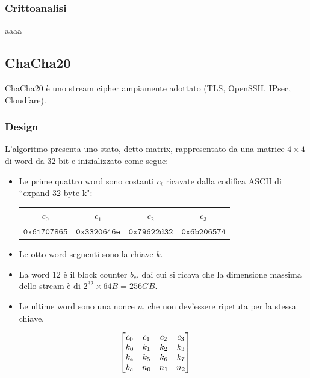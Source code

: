 \documentclass[target=bach,aauheader=,style=]{thud}
\begin{document}
			\subsubsection{Crittoanalisi}
			aaaa
		\subsection{ChaCha20\cite{chacha20}}
		ChaCha20 è uno stream cipher ampiamente adottato (TLS, OpenSSH, IPsec, Cloudfare).
			\subsubsection{Design}
			L'algoritmo presenta uno stato, detto matrix, rappresentato da una matrice $4 \times 4$ di word da 32 bit e inizializzato come segue:
			\begin{itemize}
				\item Le prime quattro word sono costanti $c_i$ ricavate dalla codifica ASCII di ``expand 32-byte k":
				\begin{center}
					\begin{tabular}{|c|c|c|c|}
						\hline
						$c_0$ & $c_1$ & $c_2$ & $c_3$\\
						\hline
						$\mathtt{0x61707865}$ & $\mathtt{0x3320646e}$ & $\mathtt{0x79622d32}$ & $\mathtt{0x6b206574}$\\
						\hline
					\end{tabular}
				\end{center}
				\item Le otto word seguenti sono la chiave $k$.
				\item La word 12 è il block counter $b_c$, dai cui si ricava che la dimensione massima dello stream è di $2^{32} \times 64B = 256GB$.
				\item Le ultime word sono una nonce $n$, che non dev'essere ripetuta per la stessa chiave. 
			\end{itemize}
			\[
				\begin{bmatrix}
					c_0 & c_1 & c_2 & c_3\\
					k_0 & k_1 & k_2 & k_3\\
					k_4 & k_5 & k_6 & k_7\\
					b_c & n_0 & n_1 & n_2\\
				\end{bmatrix}\\
			\]
			
\end{document}
